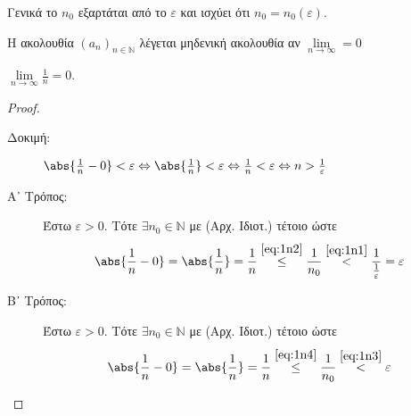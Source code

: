 \documentclass[main.tex]{subfiles}
\begin{document}
\begin{rem}
    Γενικά το $ n_{0} $ εξαρτάται από το $ \varepsilon $ και ισχύει ότι
    $ n_{0} = n_{0}(\varepsilon) $.
\end{rem}

\begin{dfn}
    Η ακολουθία $ (a_{n})_{n \in \mathbb{N}}$ λέγεται μηδενική ακολουθία 
    αν $ \lim\limits_{n\to \infty} = 0 $
\end{dfn}

\begin{examples}
\item {}
    \begin{enumerate}[i)]
        \item $ \lim\limits_{n \to \infty} \frac{1}{n} = 0 $.
            \begin{proof}
            \item {}
                \begin{description}
                    \item[Δοκιμή:] $ \abs{\frac{1}{n} -0} < \varepsilon
                        \Leftrightarrow \abs{\frac{1}{n}} < \varepsilon 
                        \Leftrightarrow \frac{1}{n} < \varepsilon 
                        \Leftrightarrow n > \frac{1}{\varepsilon}$
                \end{description}
                \begin{description}
                    \item[Α᾽ Τρόπος:] 
                Έστω $ \varepsilon >0 $. Τότε $ \exists n_{0} \in\mathbb{N} $
                με  (Αρχ. Ιδιοτ.) τέτοιο 
                ώστε 
                        \[
                            \abs{\frac{1}{n} -0} = \abs{\frac{1}{n}} =
                            \frac{1}{n} \overset{\eqref{eq:1n2}}{\leq}
                            \frac{1}{n_{0}} \overset{\eqref{eq:1n1}}{<} 
                            \frac{1}{\frac{1}{\varepsilon}} = \varepsilon 
                        \]

                    \item [Β᾽ Τρόπος:]
                Έστω $ \varepsilon >0 $. Τότε $ \exists n_{0} \in\mathbb{N} $
                με  
                (Αρχ. Ιδιοτ.) τέτοιο ώστε 
                        \[
                            \abs{\frac{1}{n} -0} = \abs{\frac{1}{n}} =
                            \frac{1}{n} \overset{\eqref{eq:1n4}}{\leq}
                         \frac{1}{n_{0}} \overset{\eqref{eq:1n3}}{<} 
                \varepsilon 
                         \]
                \end{description}
 

\end{proof}
\end{enumerate}
\end{examples}
\end{document}
